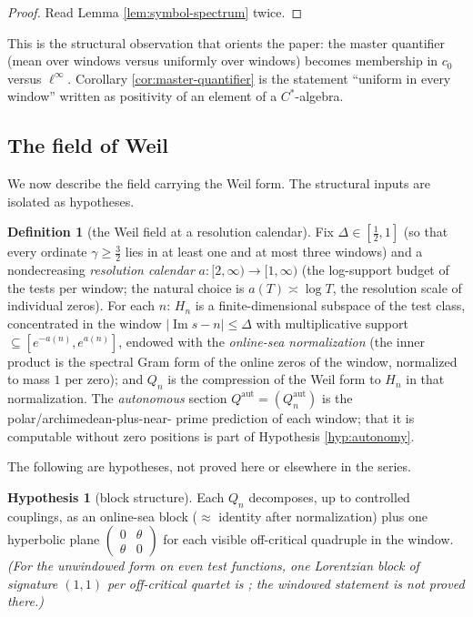 \documentclass[11pt,reqno]{amsart}
\theoremstyle{definition}
\newtheorem{definition}[theorem]{Definition}
\newtheorem{assumption}[theorem]{Hypothesis}
\newcommand{\Qaut}{Q^{\mathrm{aut}}}
\begin{document}
\begin{proof}
Read Lemma \ref{lem:symbol-spectrum} twice.
\end{proof}

This is the structural observation that orients the paper: the master
quantifier (mean over windows versus uniformly over windows) becomes membership
in \(c_0\) versus \(\ell^\infty\). Corollary \ref{cor:master-quantifier} is the
statement ``uniform in every window'' written as positivity of an element of a
\(C^*\)-algebra.

\subsection{The field of Weil}
We now describe the field carrying the Weil form. The structural inputs
are isolated as hypotheses.

\begin{definition}[the Weil field at a resolution calendar]\label{def:weil-field}
Fix \(\Delta\in[\tfrac12,1]\) (so that every ordinate \(\gamma\geq\tfrac32\) lies
in at least one and at most three windows) and a nondecreasing \emph{resolution calendar}
\(a\colon[2,\infty)\to[1,\infty)\) (the log-support budget of the tests per
window; the natural choice is \(a(T)\asymp\log T\), the resolution scale of
individual zeros). For each \(n\): \(H_n\) is a finite-dimensional subspace of
the test class, concentrated in the window \(|\operatorname{Im}s-n|\leq\Delta\)
with multiplicative support \(\subseteq[e^{-a(n)},e^{a(n)}]\), endowed with the
\emph{online-sea normalization} (the inner product is the spectral Gram form of
the online zeros of the window, normalized to mass \(1\) per zero); and \(Q_n\)
is the compression of the Weil form to \(H_n\) in that normalization. The
\emph{autonomous} section \(\Qaut=(\Qaut_n)\) is the polar/archimedean-plus-near-
prime prediction of each window; that it is computable
without zero positions is part of Hypothesis \ref{hyp:autonomy}.
\end{definition}

The following are hypotheses, not proved here or elsewhere in the series.

\begin{assumption}[block structure]\label{hyp:blocks}
Each \(Q_n\) decomposes, up to controlled couplings, as an online-sea block
(\(\approx\) identity after normalization) plus one hyperbolic plane
\(\left(\begin{smallmatrix}0&\theta\\\theta&0\end{smallmatrix}\right)\) for each
visible off-critical quadruple in the window. \emph{(For the unwindowed form
on even test functions, one Lorentzian block of signature \((1,1)\) per
off-critical quartet is \cite[Theorem~3.1]{P18}; the windowed statement is not
proved there.)}
\end{assumption}
\end{document}
